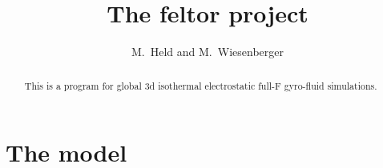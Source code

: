 





\title{The feltor project}
\author{ M.~Held and M.~Wiesenberger}
\maketitle

\begin{abstract}
This is a program for global 3d isothermal electrostatic full-F gyro-fluid simulations.
\end{abstract}

\section{The model}

